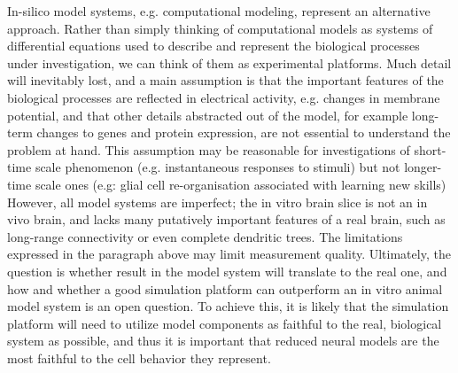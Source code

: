 In-silico model systems, e.g. computational modeling, represent an alternative approach.  Rather than simply thinking of computational models as systems of differential equations used to describe and represent the biological processes under investigation, we can think of them as experimental platforms. Much detail will inevitably lost, and a main assumption is that the important features of the biological processes are reflected in electrical activity, e.g. changes in membrane potential, and that other details abstracted out of the model, for example long-term changes to genes and protein expression, are not essential to understand the problem at hand.  This assumption may be reasonable for investigations of short-time scale phenomenon (e.g. instantaneous responses to stimuli) but not longer-time scale ones (e.g: glial cell re-organisation associated with learning new skills) %
However, all model systems are imperfect; the in vitro brain slice is not an in vivo brain, and lacks many putatively important features of a real brain, such as long-range connectivity or even complete dendritic trees.  The limitations expressed in the paragraph above may limit measurement quality.  Ultimately, the question is whether result in the model system will translate to the real one, and how and whether a good simulation platform can outperform an in vitro animal model system is an open question.  To achieve this, it is likely that the simulation platform will need to utilize model components as faithful to the real, biological system as possible, and thus it is important that reduced neural models are the most faithful to the cell behavior they represent. 
\\
